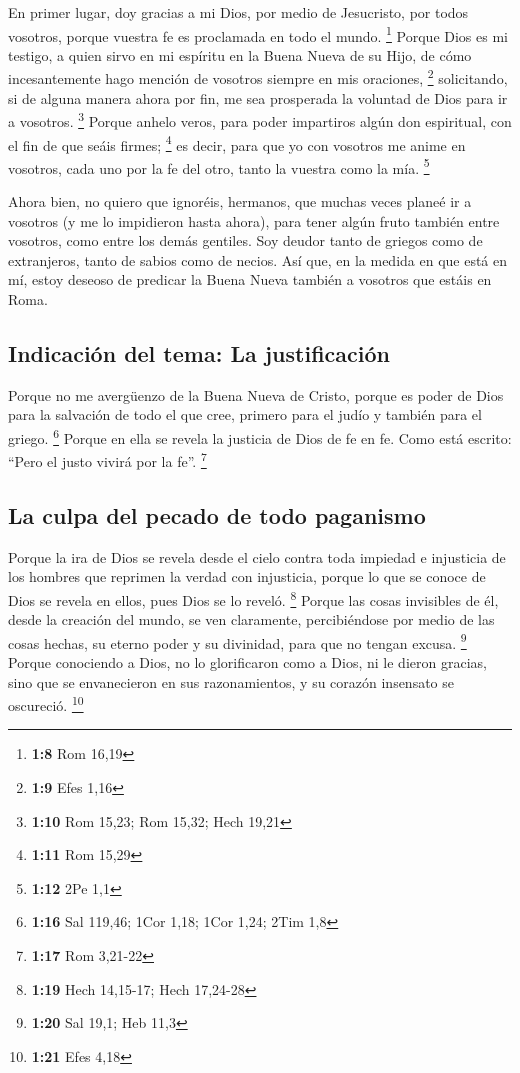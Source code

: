  En primer lugar, doy gracias a mi Dios, por medio de
Jesucristo, por todos vosotros, porque vuestra fe es proclamada en todo
el mundo. \footnote{\textbf{1:8} Rom 16,19}  Porque Dios
es mi testigo, a quien sirvo en mi espíritu en la Buena Nueva de su
Hijo, de cómo incesantemente hago mención de vosotros siempre en mis
oraciones, \footnote{\textbf{1:9} Efes 1,16} 
solicitando, si de alguna manera ahora por fin, me sea prosperada la
voluntad de Dios para ir a vosotros. \footnote{\textbf{1:10} Rom 15,23;
  Rom 15,32; Hech 19,21}  Porque anhelo veros, para poder
impartiros algún don espiritual, con el fin de que seáis firmes;
\footnote{\textbf{1:11} Rom 15,29}  es decir, para que yo
con vosotros me anime en vosotros, cada uno por la fe del otro, tanto la
vuestra como la mía. \footnote{\textbf{1:12} 2Pe 1,1}

 Ahora bien, no quiero que ignoréis, hermanos, que muchas
veces planeé ir a vosotros (y me lo impidieron hasta ahora), para tener
algún fruto también entre vosotros, como entre los demás gentiles.
 Soy deudor tanto de griegos como de extranjeros, tanto
de sabios como de necios.  Así que, en la medida en que
está en mí, estoy deseoso de predicar la Buena Nueva también a vosotros
que estáis en Roma.

\hypertarget{indicaciuxf3n-del-tema-la-justificaciuxf3n}{%
\subsection{Indicación del tema: La
justificación}\label{indicaciuxf3n-del-tema-la-justificaciuxf3n}}

 Porque no me avergüenzo de la Buena Nueva de Cristo,
porque es poder de Dios para la salvación de todo el que cree, primero
para el judío y también para el griego. \footnote{\textbf{1:16} Sal
  119,46; 1Cor 1,18; 1Cor 1,24; 2Tim 1,8}  Porque en ella
se revela la justicia de Dios de fe en fe. Como está escrito: ``Pero el
justo vivirá por la fe''. \footnote{\textbf{1:17} Rom 3,21-22}

\hypertarget{la-culpa-del-pecado-de-todo-paganismo}{%
\subsection{La culpa del pecado de todo
paganismo}\label{la-culpa-del-pecado-de-todo-paganismo}}

 Porque la ira de Dios se revela desde el cielo contra
toda impiedad e injusticia de los hombres que reprimen la verdad con
injusticia,  porque lo que se conoce de Dios se revela en
ellos, pues Dios se lo reveló. \footnote{\textbf{1:19} Hech 14,15-17;
  Hech 17,24-28}  Porque las cosas invisibles de él,
desde la creación del mundo, se ven claramente, percibiéndose por medio
de las cosas hechas, su eterno poder y su divinidad, para que no tengan
excusa. \footnote{\textbf{1:20} Sal 19,1; Heb 11,3} 
Porque conociendo a Dios, no lo glorificaron como a Dios, ni le dieron
gracias, sino que se envanecieron en sus razonamientos, y su corazón
insensato se oscureció. \footnote{\textbf{1:21} Efes 4,18}

